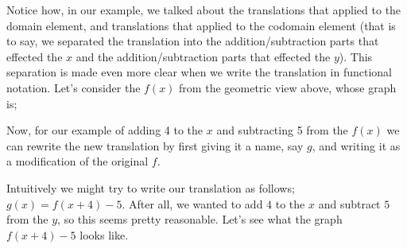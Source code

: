 \documentclass{ximeraXloud}
\begin{document}
    Notice how, in our example, we talked about the translations that applied to the domain element, and translations that applied to the codomain element (that is to say, we separated the translation into the addition/subtraction parts that effected the $x$ and the addition/subtraction parts that effected the $y$). This separation is made even more clear when we write the translation in functional notation. Let's consider the $f(x)$ from the geometric view above, whose graph is;

    \begin{minipage}{\textwidth}
        \begin{center}
        \end{center}
    \end{minipage}
    
    Now, for our example of adding 4 to the $x$ and subtracting 5 from the $f(x)$ we can rewrite the new translation by first giving it a name, say $g$, and writing it as a modification of the original $f$. 
    
    Intuitively we might try to write our translation as follows; $g(x) = f(x+4) - 5$. After all, we wanted to add $4$ to the $x$ and subtract $5$ from the $y$, so this seems pretty reasonable. Let's see what the graph $f(x+4) - 5$ looks like.
    
    \begin{minipage}{\textwidth}
        \begin{center}
        \end{center}
    \end{minipage}
    
\end{document}
